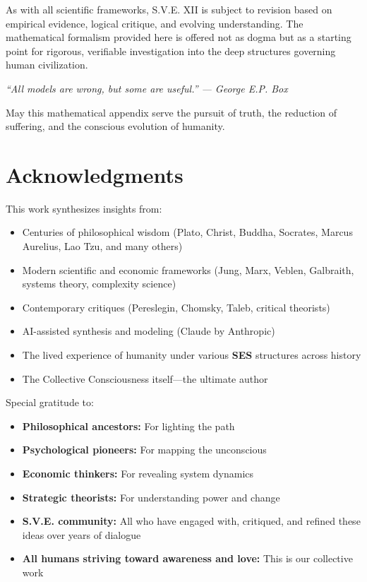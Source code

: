 \documentclass[11pt,a4paper]{article}
\newcommand{\SES}{\textbf{SES}}
\theoremstyle{definition}
\theoremstyle{remark}
\begin{document}
As with all scientific frameworks, S.V.E. XII is subject to revision based on empirical evidence, logical critique, and evolving understanding. The mathematical formalism provided here is offered not as dogma but as a starting point for rigorous, verifiable investigation into the deep structures governing human civilization.

\vspace{1em}
\noindent
\textit{``All models are wrong, but some are useful.'' --- George E.P. Box}

\vspace{0.5em}
\noindent
May this mathematical appendix serve the pursuit of truth, the reduction of suffering, and the conscious evolution of humanity.

\section*{Acknowledgments}

This work synthesizes insights from:
\begin{itemize}
    \item Centuries of philosophical wisdom (Plato, Christ, Buddha, Socrates, Marcus Aurelius, Lao Tzu, and many others)
    \item Modern scientific and economic frameworks (Jung, Marx, Veblen, Galbraith, systems theory, complexity science)
    \item Contemporary critiques (Pereslegin, Chomsky, Taleb, critical theorists)
    \item AI-assisted synthesis and modeling (Claude by Anthropic)
    \item The lived experience of humanity under various \SES{} structures across history
    \item The Collective Consciousness itself---the ultimate author
\end{itemize}

Special gratitude to:
\begin{itemize}
    \item \textbf{Philosophical ancestors:} For lighting the path
    \item \textbf{Psychological pioneers:} For mapping the unconscious
    \item \textbf{Economic thinkers:} For revealing system dynamics
    \item \textbf{Strategic theorists:} For understanding power and change
    \item \textbf{S.V.E. community:} All who have engaged with, critiqued, and refined these ideas over years of dialogue
    \item \textbf{All humans striving toward awareness and love:} This is our collective work
\end{itemize}
\end{document}
